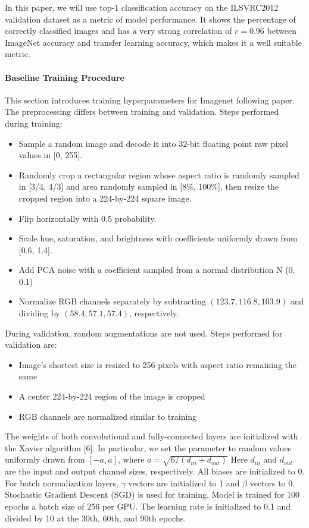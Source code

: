 In this paper, we will use top-1 classification accuracy on the ILSVRC2012 validation dataset as a metric of model performance. It shows the percentage of correctly classified images and has a very strong correlation of $r=0.96$ \cite{kornblith2019_better} between ImageNet accuracy and transfer learning accuracy, which makes it a well suitable metric.

\paragraph{Baseline Training Procedure} \label{subsec: baseline_training}
This section introduces training hyperparameters for Imagenet following \cite{he2016identity_resnetv2} paper. The preprocessing differs between training and validation. Steps performed during training:
\begin{itemize}
    \item Sample a random image and decode it into 32-bit floating point raw pixel values in [0, 255].
    \item Randomly crop a rectangular region whose aspect ratio is randomly sampled in [3/4, 4/3] and area randomly sampled in [8\%, 100\%], then resize the cropped region into a 224-by-224 square image.
    \item Flip horizontally with 0.5 probability.
    \item Scale hue, saturation, and brightness with coefficients uniformly drawn from [0.6, 1.4].
    \item Add PCA noise with a coefficient sampled from a normal distribution N (0, 0.1)
    \item Normalize RGB channels separately by subtracting $(123.7, 116.8, 103.9)$ and dividing by $(58.4, 57.1, 57.4)$, respectively.
\end{itemize}

During validation, random augmentations are not used. Steps performed for validation are:

\begin{itemize}
  \item Image's shortest size is resized to 256 pixels with aspect ratio remaining the same
  \item A center 224-by-224 region of the image is cropped
  \item RGB channels are normalized similar to training
\end{itemize}

The weights of both convolutional and fully-connected layers are initialized with the Xavier algorithm [6]. In particular, we set the parameter to random values uniformly drawn from $[−a, a]$, where $ a = \sqrt{6 / (d_{in} + d_{out})} $ Here $d_{in}$ and $d_{out}$ are the input and output channel sizes, respectively. All biases are initialized to 0. For batch normalization layers, $\gamma$ vectors are initialized to 1 and $\beta$ vectors to 0.
Stochastic Gradient Descent (SGD) is used for training. Model is trained for 100 epochs a batch size of 256 per GPU. The learning rate is initialized to 0.1 and divided by 10 at the 30th, 60th, and 90th epochs. %

